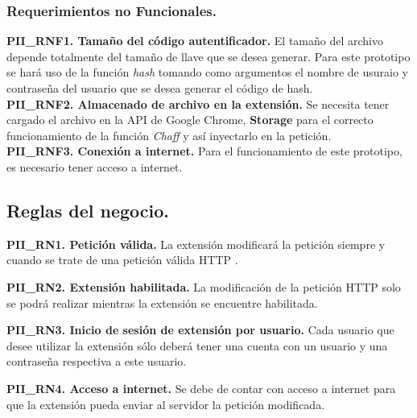 \documentclass[12pt, a4paper, titlepage]{report}
\begin{document}
				\subsubsection{Requerimientos no Funcionales.}
				{\setlength{\parindent}{12pt}
				
				\textbf{PII\_RNF1. Tamaño del código autentificador.} El tamaño del archivo depende totalmente del tamaño de llave que se desea generar. Para este prototipo se hará uso de la función \textit{hash} tomando como argumentos el nombre de usuraio y contraseña del usuario que se desea generar el código de hash.\\
				
				\textbf{PII\_RNF2. Almacenado de archivo en la extensión.} Se necesita tener cargado el archivo en la API de Google Chrome, \textbf{Storage} para el correcto funcionamiento de la función \textit{Chaff} y así inyectarlo en la petición. \\
				
				\textbf{PII\_RNF3. Conexión a internet.} Para el funcionamiento de este prototipo, es necesario tener acceso a internet. \\
				
				}
		    
		    \subsection{Reglas del negocio.}
		        
            \textbf{PII\_RN1. Petición válida.} La extensión modificará la petición siempre y cuando se trate de una petición válida HTTP .\\
            \label{PII_RN1}
            
            \textbf{PII\_RN2. Extensión habilitada.} La modificación de la petición HTTP solo se podrá realizar mientras la extensión se encuentre habilitada.\\
            \label{PII_RN2}
            
            \textbf{PII\_RN3. Inicio de sesión de extensión por usuario.} Cada usuario que desee utilizar la extensión sólo deberá tener una cuenta con un usuario y una contraseña respectiva a este usuario. \\
            \label{PII_RN3}
            
            \textbf{PII\_RN4. Acceso a internet.} Se debe de contar con acceso a internet para que la extensión pueda enviar al servidor la petición modificada.\\
            \label{PII_RN4}
				
\end{document}

